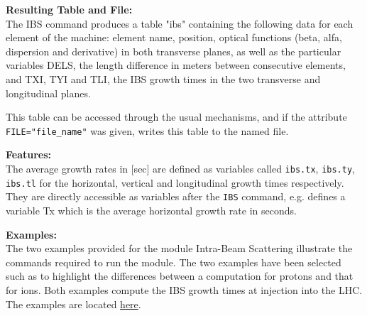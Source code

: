 {\bf Resulting Table and File:} \\
The IBS command produces a table "ibs" containing the following data for
each element of the machine: element name, position, optical functions
(beta, alfa, dispersion and derivative) in both transverse planes, as
well as the particular variables DELS, the length difference in meters
between consecutive elements, and TXI, TYI and TLI, the IBS growth times
in the two transverse and longitudinal planes. 

This table can be accessed through the usual mechanisms, and if the
attribute \texttt{FILE="file\_name"} was given, \madx writes this table
to the named file.  



{\bf Features:} \\
The average growth rates in [sec] are defined as variables called
\texttt{ibs.tx}, \texttt{ibs.ty}, \texttt{ibs.tl} for the horizontal,
vertical and longitudinal growth times respectively. They are directly
accessible as variables after the \texttt{IBS} command, e.g.
defines a variable Tx which is the average horizontal growth rate in seconds. 



{\bf Examples:} \\
The two examples provided for the module Intra-Beam Scattering
illustrate the commands required to run the module. The two examples
have been selected such as to highlight the differences between a
computation for protons and that for ions. Both examples compute the IBS
growth times at injection into the LHC. The examples are located
\href{http://madx.web.cern.ch/madx/madX/examples/ibs/}{here}.


